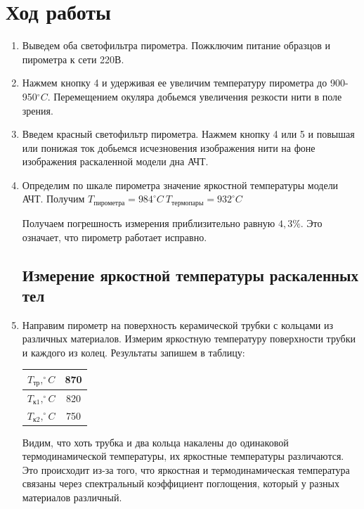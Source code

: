 \documentclass[a4paper, 12pt]{article}%
\begin{document}
\section{Ход работы}
\begin{enumerate}

\subsection{Изучение работы оптического пирометра}
\item Выведем оба светофильтра пирометра. Пожключим питание образцов и пирометра к сети 220В. 

\item Нажмем кнопку 4 и удерживая ее увеличим температуру пирометра до 900-950$^{\circ}C$. Перемещением окуляра добьемся увеличения резкости нити в поле зрения.

\item Введем красный светофильтр пирометра. Нажмем кнопку 4 или 5 и повышая или понижая ток добьемся исчезновения изображения нити на фоне изображения раскаленной модели дна АЧТ.

\item Определим по шкале пирометра значение яркостной температуры модели АЧТ. Получим $T_{\text{пирометра}} = 984^{\circ} C \: T_{\text{термопары}} = 932^{\circ} C$

Получаем погрешность измерения приблизительно равную $4,3 \%$. Это означает, что пирометр работает исправно.


\subsection{Измерение яркостной температуры раскаленных тел}
\item Направим пирометр на поверхность керамической трубки с кольцами из различных материалов. Измерим яркостную температуру поверхности трубки и каждого из колец. Результаты запишем в таблицу:

\begin{center}
\begin{tabular}{|c|c|}
\hline 
$T_{\text{тр}}, ^{\circ} C$ & 870 \\ 
\hline 
$T_{\text{к1}}, ^{\circ} C$ & 820 \\ 
\hline 
$T_{\text{к2}}, ^{\circ} C$ & 750 \\ 
\hline 
\end{tabular} 
\end{center}

Видим, что хоть трубка и два кольца накалены до одинаковой термодинамической температуры, их яркостные температуры различаются. Это происходит из-за того, что яркостная и термодинамическая температура связаны через спектральный коэффициент поглощения, который у разных материалов различный.


\end{enumerate}
\end{document}
